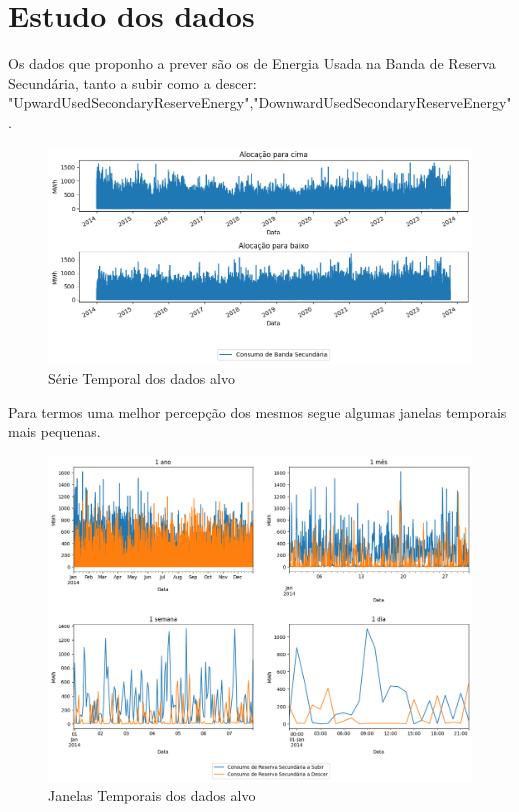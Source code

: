 
\section{Estudo dos dados}

Os dados que proponho a prever são os de Energia Usada na Banda de Reserva Secundária, tanto a subir como a descer: "UpwardUsedSecondaryReserveEnergy","DownwardUsedSecondaryReserveEnergy".\par



\begin{figure}[H]
  \centering
  \includegraphics[width=\textwidth]{plots/consumo_originais.png}
  \caption{Série Temporal dos dados alvo}
  \label{fig:targettimeseries}
\end{figure}


Para termos uma melhor percepção dos mesmos segue algumas janelas temporais mais pequenas.

\begin{figure}[H]
  \centering
  \includegraphics[width=\textwidth]{plots/target_timeseries_windows.png}
  \caption{Janelas Temporais dos dados alvo}
  \label{fig:targettimeserieswindows}
\end{figure}


